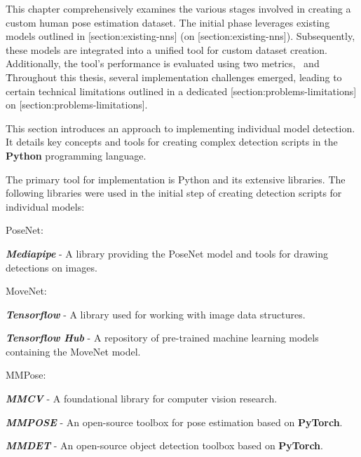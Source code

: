 This chapter comprehensively examines the various stages involved in creating a custom human pose estimation dataset. The initial phase leverages existing models outlined in [section:existing-nns] (on [section:existing-nns]). Subsequently, these models are integrated into a unified tool for custom dataset creation. Additionally, the tool's performance is evaluated using two metrics, \APE\ and \OKS\.

Throughout this thesis, several implementation challenges emerged, leading to certain technical limitations outlined in a dedicated [section:problems-limitations] on [section:problems-limitations].

This section introduces an approach to implementing individual model detection. It details key concepts and tools for creating complex detection scripts in the {\bf Python} programming language.

The primary tool for implementation is Python and its extensive libraries. The following libraries were used in the initial step of creating detection scripts for individual models:

\startitemize[n]
    \item PoseNet:
        \startitemize[1]
            \item {\bf {\em Mediapipe}} - A library providing the PoseNet model and tools for drawing detections on images.
        \stopitemize
    \item MoveNet:
        \startitemize[1]
            \item {\bf {\em Tensorflow}} - A library used for working with image data structures.
            \item {\bf {\em Tensorflow Hub}} - A repository of pre-trained machine learning models containing the MoveNet model.
        \stopitemize
    \item MMPose:
        \startitemize[1]
            \item {\bf {\em MMCV}} - A foundational library for computer vision research.
            \item {\bf {\em MMPOSE}} - An open-source toolbox for pose estimation based on {\bf PyTorch}.
            \item {\bf {\em MMDET}} - An open-source object detection toolbox based on {\bf PyTorch}.
        \stopitemize
\stopitemize

